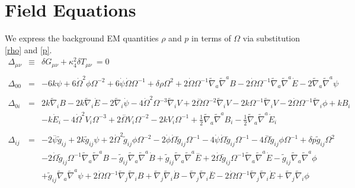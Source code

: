 \documentclass[10pt,letterpaper]{article}
\numberwithin{equation}{section}
\begin{document}
\section{Field Equations}
We express the background EM quantities $\rho$ and $p$ in terms of $\Omega$ via substitution \eqref{rho} and \eqref{p}.
\begin{eqnarray}
\Delta_{\mu\nu} &\equiv& \delta G_{\mu\nu} +\kappa^2_4\delta T_{\mu\nu}\ =0
\\ \nonumber\\
\Delta_{00}&=& -6 k \psi + 6 \dot{\Omega}^2 \phi \Omega^{-2} + 6 \dot{\psi} \dot{\Omega} \Omega^{-1} + \delta \rho \Omega^2 + 2 \dot{\Omega} \Omega^{-1} \tilde{\nabla}_{a}\tilde{\nabla}^{a}B - 2 \dot{\Omega} \Omega^{-1} \tilde{\nabla}_{a}\tilde{\nabla}^{a}\dot{E} - 2 \tilde{\nabla}_{a}\tilde{\nabla}^{a}\psi 
\\  \nonumber\\ 
\Delta_{0i}&=& 2 k \tilde{\nabla}_{i}B - 2 k \tilde{\nabla}_{i}\dot{E} - 2 \tilde{\nabla}_{i}\dot{\psi} - 4 \dot{\Omega}^2 \Omega^{-3} \tilde{\nabla}_{i}V + 2 \overset{..}{\Omega} \Omega^{-2} \tilde{\nabla}_{i}V - 2 k \Omega^{-1} \tilde{\nabla}_{i}V - 2 \dot{\Omega} \Omega^{-1} \tilde{\nabla}_{i}\phi +k B_{i} \nonumber \\ 
&& -  k \dot{E}_{i} - 4 \dot{\Omega}^2 V_{i} \Omega^{-3} + 2 \overset{..}{\Omega} V_{i} \Omega^{-2} - 2 k V_{i} \Omega^{-1} + \tfrac{1}{2} \tilde{\nabla}_{a}\tilde{\nabla}^{a}B_{i} -  \tfrac{1}{2} \tilde{\nabla}_{a}\tilde{\nabla}^{a}\dot{E}_{i}
\\  \nonumber\\ 
\Delta_{ij}&=& -2 \overset{..}{\psi} \tilde{g}_{ij} + 2 k \tilde{g}_{ij} \psi + 2 \dot{\Omega}^2 \tilde{g}_{ij} \phi \Omega^{-2} - 2 \dot{\phi} \dot{\Omega} \tilde{g}_{ij} \Omega^{-1} - 4 \dot{\psi} \dot{\Omega} \tilde{g}_{ij} \Omega^{-1} - 4 \overset{..}{\Omega} \tilde{g}_{ij} \phi \Omega^{-1} + \delta p \tilde{g}_{ij} \Omega^2 \nonumber \\ 
&& - 2 \dot{\Omega} \tilde{g}_{ij} \Omega^{-1} \tilde{\nabla}_{a}\tilde{\nabla}^{a}B -  \tilde{g}_{ij} \tilde{\nabla}_{a}\tilde{\nabla}^{a}\dot{B} + \tilde{g}_{ij} \tilde{\nabla}_{a}\tilde{\nabla}^{a}\overset{..}{E} + 2 \dot{\Omega} \tilde{g}_{ij} \Omega^{-1} \tilde{\nabla}_{a}\tilde{\nabla}^{a}\dot{E} -  \tilde{g}_{ij} \tilde{\nabla}_{a}\tilde{\nabla}^{a}\phi \nonumber \\ 
&& + \tilde{g}_{ij} \tilde{\nabla}_{a}\tilde{\nabla}^{a}\psi + 2 \dot{\Omega} \Omega^{-1} \tilde{\nabla}_{j}\tilde{\nabla}_{i}B + \tilde{\nabla}_{j}\tilde{\nabla}_{i}\dot{B} -  \tilde{\nabla}_{j}\tilde{\nabla}_{i}\overset{..}{E} - 2 \dot{\Omega} \Omega^{-1} \tilde{\nabla}_{j}\tilde{\nabla}_{i}\dot{E} + \tilde{\nabla}_{j}\tilde{\nabla}_{i}\phi \nonumber \\ 

\end{eqnarray}
\end{document}

